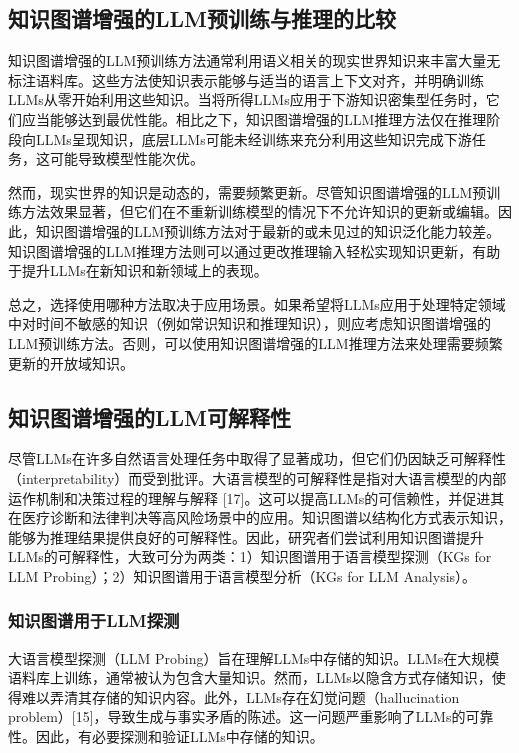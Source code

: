 \documentclass[11pt,UTF8,fontset=fandol]{ctexart}
\begin{document}
\subsection{知识图谱增强的LLM预训练与推理的比较}

知识图谱增强的LLM预训练方法通常利用语义相关的现实世界知识来丰富大量无标注语料库。这些方法使知识表示能够与适当的语言上下文对齐，并明确训练LLMs从零开始利用这些知识。当将所得LLMs应用于下游知识密集型任务时，它们应当能够达到最优性能。相比之下，知识图谱增强的LLM推理方法仅在推理阶段向LLMs呈现知识，底层LLMs可能未经训练来充分利用这些知识完成下游任务，这可能导致模型性能次优。

然而，现实世界的知识是动态的，需要频繁更新。尽管知识图谱增强的LLM预训练方法效果显著，但它们在不重新训练模型的情况下不允许知识的更新或编辑。因此，知识图谱增强的LLM预训练方法对于最新的或未见过的知识泛化能力较差。知识图谱增强的LLM推理方法则可以通过更改推理输入轻松实现知识更新，有助于提升LLMs在新知识和新领域上的表现。

总之，选择使用哪种方法取决于应用场景。如果希望将LLMs应用于处理特定领域中对时间不敏感的知识（例如常识知识和推理知识），则应考虑知识图谱增强的LLM预训练方法。否则，可以使用知识图谱增强的LLM推理方法来处理需要频繁更新的开放域知识。

\subsection{知识图谱增强的LLM可解释性}

尽管LLMs在许多自然语言处理任务中取得了显著成功，但它们仍因缺乏可解释性（interpretability）而受到批评。大语言模型的可解释性是指对大语言模型的内部运作机制和决策过程的理解与解释 [17]。这可以提高LLMs的可信赖性，并促进其在医疗诊断和法律判决等高风险场景中的应用。知识图谱以结构化方式表示知识，能够为推理结果提供良好的可解释性。因此，研究者们尝试利用知识图谱提升LLMs的可解释性，大致可分为两类：1）知识图谱用于语言模型探测（KGs for LLM Probing）；2）知识图谱用于语言模型分析（KGs for LLM Analysis）。

\subsubsection{知识图谱用于LLM探测}

大语言模型探测（LLM Probing）旨在理解LLMs中存储的知识。LLMs在大规模语料库上训练，通常被认为包含大量知识。然而，LLMs以隐含方式存储知识，使得难以弄清其存储的知识内容。此外，LLMs存在幻觉问题（hallucination problem）[15]，导致生成与事实矛盾的陈述。这一问题严重影响了LLMs的可靠性。因此，有必要探测和验证LLMs中存储的知识。
\end{document}

